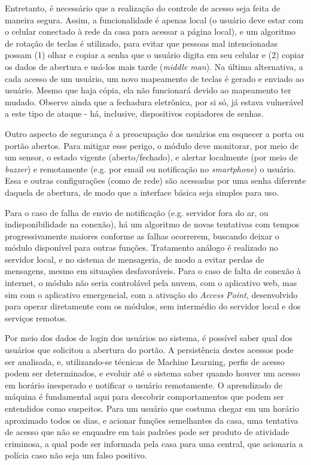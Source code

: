 Entretanto, é necessário que a realização do controle de acesso seja feita de maneira segura. Assim, a funcionalidade é apenas local (o usuário deve estar com o celular conectado à rede da casa para acessar a página local), e um algoritmo de rotação de teclas é utilizado, para evitar que pessoas mal intencionadas possam (1) olhar e copiar a senha que o usuário digita em seu celular e (2) copiar os dados de abertura e usá-los mais tarde (\textit{middle man}). Na última alternativa, a cada acesso de um usuário, um novo mapeamento de teclas é gerado e enviado ao usuário. Mesmo que haja cópia, ela não funcionará devido ao mapeamento ter mudado. Observe ainda que a fechadura eletrônica, por si só, já estava vulnerável a este tipo de ataque - há, inclusive, dispositivos copiadores de senhas.

Outro aspecto de segurança é a preocupação dos usuários em esquecer a porta ou portão abertos. Para mitigar esse perigo, o módulo deve monitorar, por meio de um sensor, o estado vigente (aberto/fechado), e alertar localmente (por meio de \textit{buzzer}) e remotamente (e.g. por email ou notificação no \textit{smartphone}) o usuário. Essa e outras configurações (como de rede) são acessadas por uma senha diferente daquela de abertura, de modo que a interface básica seja simples para uso.

Para o caso de falha de envio de notificação (e.g. servidor fora do ar, ou indisponibilidade na conexão), há um algoritmo de novas tentativas com tempos progressivamente maiores conforme as falhas ocorrerem, buscando deixar o módulo disponível para outras funções. Tratamento análogo é realizado no servidor local, e no sistema de mensageria, de modo a evitar perdas de mensagens, mesmo em situações desfavoráveis. Para o caso de falta de conexão à internet, o módulo não seria controlável pela nuvem, com o aplicativo web, mas sim com o aplicativo emergencial, com a ativação do \textit{Access Point}, desenvolvido para operar diretamente com os módulos, sem intermédio do servidor local e dos serviços remotos.

Por meio dos dados de login dos usuários no sistema, é possível saber qual dos usuários que solicitou a abertura do portão. A persistência destes acessos pode ser analisada, e, utilizando-se técnicas de Machine Learning, perfis de acesso podem ser determinados, e evoluir até o sistema saber quando houver um acesso em horário inesperado e notificar o usuário remotamente. O aprendizado de máquina é fundamental aqui para descobrir comportamentos que podem ser entendidos como suspeitos. Para um usuário que costuma chegar em um horário aproximado todos os dias, e acionar funções semelhantes da casa, uma tentativa de acesso que não se enquadre em tais padrões pode ser produto de atividade criminosa, a qual pode ser informada pela casa para uma central, que acionaria a polícia caso não seja um falso positivo.



